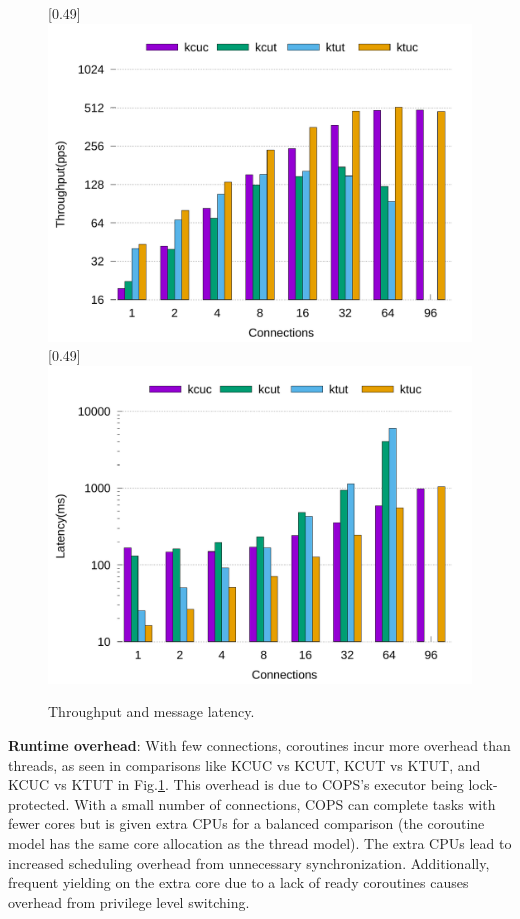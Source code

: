 \documentclass[conference]{IEEEtran}
\begin{document}
\begin{figure}[tbp]
	\centering
	[0.49\linewidth]
	{
		\includegraphics[width=\linewidth]{assets/throughput.pdf}
	}
	[0.49\linewidth]
	{
		\includegraphics[width=\linewidth]{assets/latency.pdf}
	}
	\caption{Throughput and message latency.}
	\label{fig:throughput-latency}
  \vspace{-1em}
\end{figure}

\textbf{Runtime overhead}: With few connections, coroutines incur more overhead than threads, as seen in comparisons like KCUC vs KCUT, KCUT vs KTUT, and KCUC vs KTUT in Fig.\ref{fig:throughput-latency}. This overhead is due to COPS's executor being lock-protected. With a small number of connections, COPS can complete tasks with fewer cores but is given extra CPUs for a balanced comparison (the coroutine model has the same core allocation as the thread model). The extra CPUs lead to increased scheduling overhead from unnecessary synchronization. Additionally, frequent yielding on the extra core due to a lack of ready coroutines causes overhead from privilege level switching.
\end{document}
